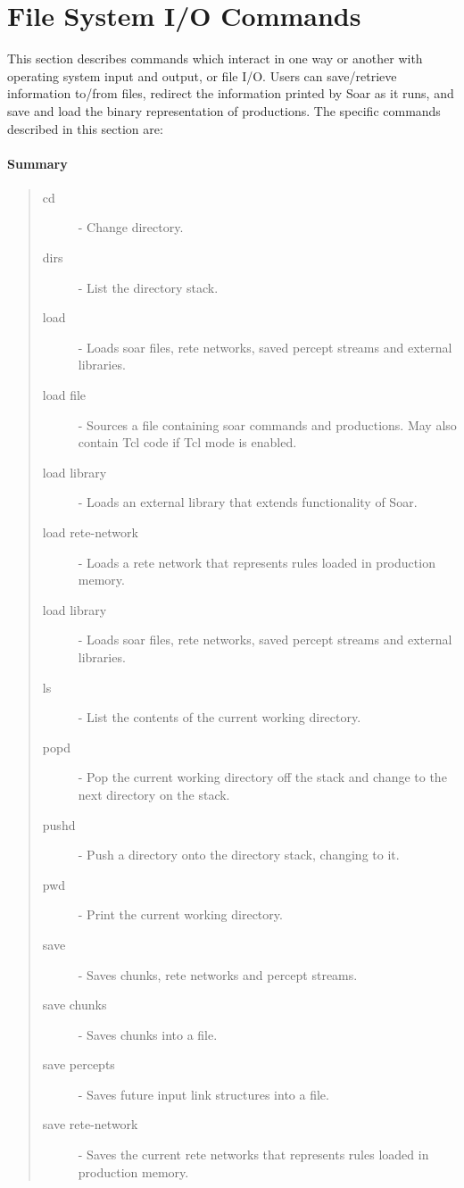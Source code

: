 








\section{File System I/O Commands}
\label{FILE-IO}

This section describes commands which interact in one way or another
with operating system input and output, or file I/O.  Users can
save/retrieve information to/from files, redirect the information
printed by Soar as it runs, and save and load the binary representation
of productions.
The specific commands described in this section are:

\paragraph{Summary}
\begin{quote}
\begin{description}
\item[cd] - Change directory.
\item[dirs] - List the directory stack.
\item[load] - Loads soar files, rete networks, saved percept streams and external libraries.
\item[load file] - Sources a file containing soar commands and productions.  May also contain Tcl code if Tcl mode is enabled.
\item[load library] - Loads an external library that extends functionality of Soar.
\item[load rete-network] - Loads a rete network that represents rules loaded in production memory.
\item[load library] - Loads soar files, rete networks, saved percept streams and external libraries.
\item[ls] - List the contents of the current working directory.
\item[popd] - Pop the current working directory off the stack and change to the next directory on the stack.
\item[pushd] - Push a directory onto the directory stack, changing to it.
\item[pwd] - Print the current working directory.
\item[save] - Saves chunks, rete networks and percept streams.
\item[save chunks] - Saves chunks into a file.
\item[save percepts] - Saves future input link structures into a file.
\item[save rete-network] - Saves the current rete networks that represents rules loaded in production memory.
\end{description}
\end{quote}

